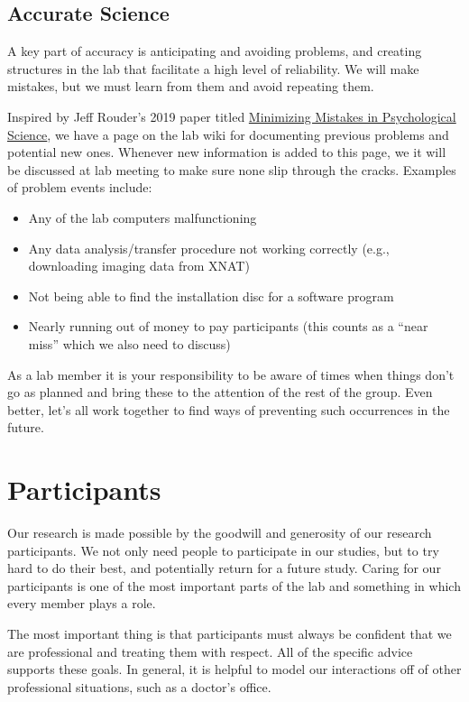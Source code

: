 \documentclass[letterpaper,11pt,oneside]{memoir}
\begin{document}
\subsection{Accurate Science}

A key part of accuracy is anticipating and avoiding problems, and creating structures in the lab that facilitate a high level of reliability. We will make mistakes, but we must learn from them and avoid repeating them.

Inspired by Jeff Rouder's 2019 paper titled \href{https://doi.org/10.1177/2515245918801915}{Minimizing Mistakes in Psychological Science}, we have a page on the lab wiki for documenting previous problems and potential new ones. Whenever new information is added to this page, we it will be discussed at lab meeting to make sure none slip through the cracks. Examples of problem events include:

\begin{itemize}
\item Any of the lab computers malfunctioning
\item Any data analysis/transfer procedure not working correctly (e.g., downloading imaging data from XNAT)
\item Not being able to find the installation disc for a software program
\item Nearly running out of money to pay participants (this counts as a ``near miss'' which we also need to discuss)
\end{itemize}

As a lab member it is your responsibility to be aware of times when things don't go as planned and bring these to the attention of the rest of the group. Even better, let's all work together to find ways of preventing such occurrences in the future.




\section{Participants}
\label{sec:participants}

Our research is made possible by the goodwill and generosity of our research participants. We not only need people to participate in our studies, but to try hard to do their best, and potentially return for a future study. Caring for our participants is one of the most important parts of the lab and something in which every member plays a role.

The most important thing is that participants must always be confident that we are professional and treating them with respect. All of the specific advice supports these goals. In general, it is helpful to model our interactions off of other professional situations, such as a doctor's office.
\end{document}
